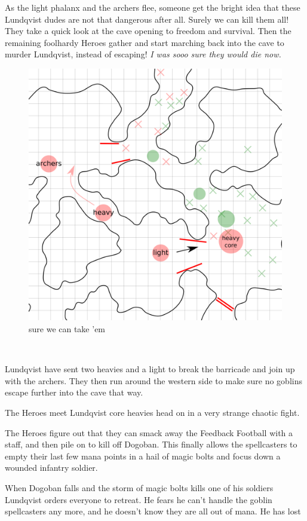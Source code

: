 As the light phalanx and the archers flee, someone get the bright idea that these Lundqvist dudes are not that dangerous after all. Surely we can kill them all! They take a quick look at the cave opening to freedom and survival. Then the remaining foolhardy Heroes gather and start marching back into the cave to murder Lundqvist, instead of escaping! \textit{I was sooo sure they would die now.}


\begin{figure}    %
\centering
\includegraphics[width=0.9\linewidth]{./fig/hool2lundqvistresult5-zoom.png}
\caption*{sure we can take 'em}
\end{figure}

\

Lundqvist have sent two heavies and a light to break the barricade and join up with the archers. They then run around the western side to make sure no goblins escape further into the cave that way.

The Heroes meet Lundqvist core heavies head on in a very strange chaotic fight.


The Heroes figure out that they can smack away the Feedback Football with a staff, and then pile on to kill off Dogoban. This finally allows the spellcasters to empty their last few mana points in a hail of magic bolts and focus down a wounded infantry soldier. 

When Dogoban falls and the storm of magic bolts kills one of his soldiers Lundqvist orders everyone to retreat. He fears he can't handle the goblin spellcasters any more, and he doesn't know they are all out of mana. He has lost 

